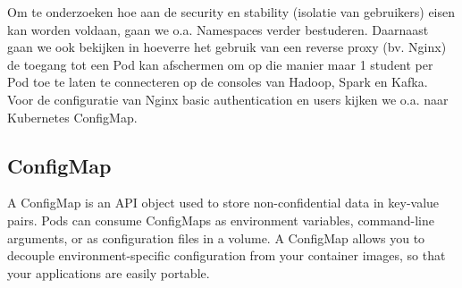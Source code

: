 \newline
\newline
\newline
Om te onderzoeken hoe aan de security en stability (isolatie van gebruikers) eisen kan worden voldaan, gaan we o.a. Namespaces verder bestuderen. Daarnaast gaan we ook bekijken in hoeverre het gebruik van een reverse proxy (bv. Nginx) de toegang tot een Pod kan afschermen om op die manier maar 1 student per Pod toe te laten te connecteren op de consoles van Hadoop, Spark en Kafka.
\newline
\newline
Voor de configuratie van Nginx basic authentication en users kijken we o.a. naar Kubernetes ConfigMap.

\subsection{ConfigMap}
A ConfigMap is an API object used to store non-confidential data in key-value pairs. Pods can consume ConfigMaps as environment variables, command-line arguments, or as configuration files in a volume.
A ConfigMap allows you to decouple environment-specific configuration from your container images, so that your applications are easily portable.\autocite{Kubernetes2023}

